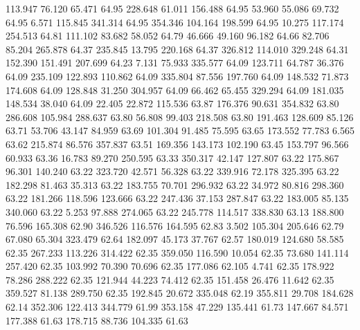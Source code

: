  113.947   76.120   65.471        64.95
 228.648   61.011  156.488        64.95
  53.960   55.086   69.732        64.95
   6.571  115.845  341.314        64.95
 354.346  104.164  198.599        64.95
  10.275  117.174  254.513        64.81
 111.102   83.682   58.052        64.79
  46.666   49.160   96.182        64.66
  82.706   85.204  265.878        64.37
 235.845   13.795  220.168        64.37
 326.812  114.010  329.248        64.31
 152.390  151.491  207.699        64.23
   7.131   75.933  335.577        64.09
 123.711   64.787   36.376        64.09
 235.109  122.893  110.862        64.09
 335.804   87.556  197.760        64.09
 148.532   71.873  174.608        64.09
 128.848   31.250  304.957        64.09
  66.462   65.455  329.294        64.09
 181.035  148.534   38.040        64.09
  22.405   22.872  115.536        63.87
 176.376   90.631  354.832        63.80
 286.608  105.984  288.637        63.80
  56.808   99.403  218.508        63.80
 191.463  128.609   85.126        63.71
  53.706   43.147   84.959        63.69
 101.304   91.485   75.595        63.65
 173.552   77.783    6.565        63.62
 215.874   86.576  357.837        63.51
 169.356  143.173  102.190        63.45
 153.797   96.566   60.933        63.36
  16.783   89.270  250.595        63.33
 350.317   42.147  127.807        63.22
 175.867   96.301  140.240        63.22
 323.720   42.571   56.328        63.22
 339.916   72.178  325.395        63.22
 182.298   81.463   35.313        63.22
 183.755   70.701  296.932        63.22
  34.972   80.816  298.360        63.22
 181.266  118.596  123.666        63.22
 247.436   37.153  287.847        63.22
 183.005   85.135  340.060        63.22
   5.253   97.888  274.065        63.22
 245.778  114.517  338.830        63.13
 188.800   76.596  165.308        62.90
 346.526  116.576  164.595        62.83
   3.502  105.304  205.646        62.79
  67.080   65.304  323.479        62.64
 182.097   45.173   37.767        62.57
 180.019  124.680   58.585        62.35
 267.233  113.226  314.422        62.35
 359.050  116.590   10.054        62.35
  73.680  141.114  257.420        62.35
 103.992   70.390   70.696        62.35
 177.086   62.105    4.741        62.35
 178.922   78.286  288.222        62.35
 121.944   44.223   74.412        62.35
 151.458   26.476   11.642        62.35
 359.527   81.138  289.750        62.35
 192.845   20.672  335.048        62.19
 355.811   29.708  184.628        62.14
 352.306  122.413  344.779        61.99
 353.158   47.229  135.441        61.73
 147.667   84.571  177.388        61.63
 178.715   88.736  104.335        61.63
